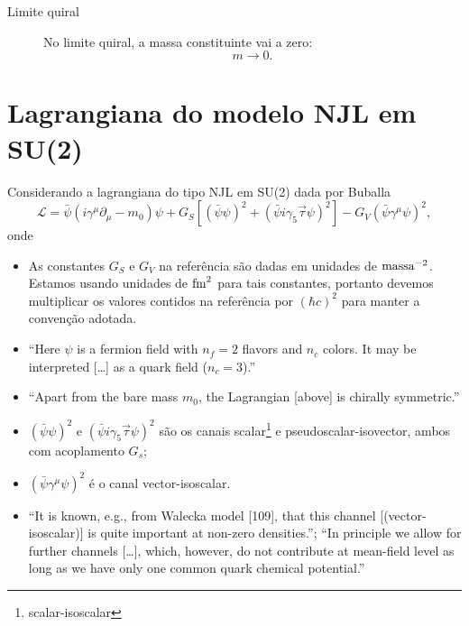 \begin{description}
	\item[Limite quiral] No limite quiral, a massa constituinte vai a zero:
		\begin{equation}
			m \to 0.
		\end{equation}
\end{description}

\section{Lagrangiana do modelo NJL em SU(2)}

Considerando a lagrangiana do tipo NJL em SU(2) dada por Buballa\cite{Buballa1996}
\begin{equation}
	\mathcal{L} = \bar{\psi}(i\gamma^\mu\partial_\mu - m_0)\psi + G_S[(\bar{\psi}\psi)^2 + (\bar{\psi}i\gamma_5\vec{\tau}\psi)^2] - G_V(\bar{\psi}\gamma^\mu \psi)^2,
\end{equation}
%
onde
\begin{itemize}
	\item As constantes $G_S$ e $G_V$ na referência são dadas em unidades de $\rm{massa}^{-2}$. Estamos usando unidades de $\rm{fm}^2$ para tais constantes, portanto devemos multiplicar os valores contidos na referência por $(\hbar c)^2$ para manter a convenção adotada.
	\item ``Here $\psi$ is a fermion field with $n_f = 2$ flavors and $n_c$ colors. It may be interpreted [\dots] as a quark field ($n_c = 3$).''
	\item ``Apart from the bare mass $m_0$, the Lagrangian [above] is chirally symmetric.''
	\item $(\bar{\psi}\psi)^2$ e $(\bar{\psi}i\gamma_5\vec{\tau}\psi)^2$ são os canais scalar\footnote{scalar-isoscalar} e pseudoscalar-isovector, ambos com acoplamento $G_s$;
	\item $(\bar{\psi}\gamma^\mu \psi)^2$ é o canal vector-isoscalar. 
	\item ``It is known, e.g., from Walecka model [109], that this channel [(vector-isoscalar)] is quite important at non-zero densities.''; ``In principle we allow for further channels [\dots], which, however, do not contribute at mean-field level as long as we have only one common quark chemical potential.''\cite{Buballa}
\end{itemize}


